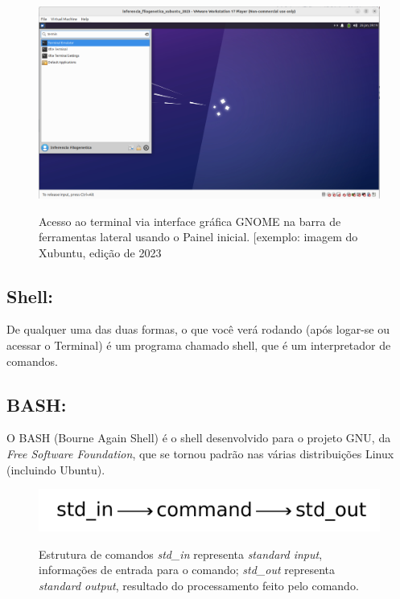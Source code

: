 \begin{refsection}
  \begin{figure}[H]
      {\includegraphics[scale=0.35]{figures/tut1/terminal2.jpg}}
      {\caption[\textit{Acesso ao terminal via interface gráfica GNOME usando o Painel inicial}]{Acesso ao terminal via interface gráfica GNOME na barra de ferramentas lateral  usando o Painel inicial. [exemplo: imagem do Xubuntu, edição de 2023}\label{tut1:fig:terminal2}}
  \end{figure}


\subsection{Shell:}\label{tut1:text_mode:commands:shell}
 De qualquer uma das duas formas, o que você verá rodando (após logar-se ou acessar o Terminal) é um programa chamado shell, que é um interpretador de comandos.\\
 \subsection{BASH:}\label{tut1:text_mode:commands:bash}
O BASH (Bourne Again Shell) é o shell desenvolvido para o projeto GNU, da \textit{Free Software Foundation}, que se tornou padrão nas várias distribuições Linux (incluindo Ubuntu).\\

  \begin{figure}[H]
       \centering
      {\includegraphics[scale=0.8]{figures/tut1/command_line.pdf}}
      {\caption[\textit{Estrutura de comandos}]{Estrutura de comandos\: \textit{std\_in} representa \textit{standard input}, informações de entrada para o comando;  \textit{std\_out} representa \textit{standard output}, resultado do processamento feito pelo comando.}\label{tut1:fig:commands}}


\end{figure}
\end{refsection}
